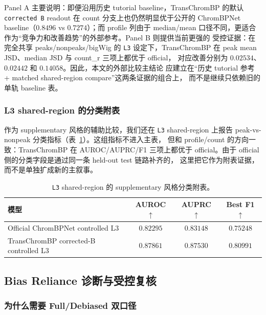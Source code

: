 \documentclass[11pt,a4paper]{ctexart}
\begin{document}
Panel A 主要说明：即便沿用历史 tutorial baseline，TransChromBP 的默认
\texttt{corrected B} readout 在 count 分支上也仍然明显优于公开的
ChromBPNet baseline（$0.8496$ vs $0.7274$）；而 profile 列由于 median/mean
口径不同，更适合作为“竞争力和改善趋势”的外部参考。Panel B 则提供当前更强的
受控证据：在完全共享 peaks/nonpeaks/bigWig 的 \texttt{L3} 设定下，TransChromBP
在 peak mean JSD、median JSD 与 count\_r 三项上都优于 official，
对应改善分别为 $0.02534$、$0.02442$ 和 $0.14058$。因此，本文的外部比较主结论
应建立在“历史 tutorial 参考 + matched shared-region compare”这两条证据的组合上，
而不是继续只依赖旧的单轨 baseline 表。

\subsubsection{L3 shared-region 的分类附表}

作为 supplementary 风格的辅助比较，我们还在 \texttt{L3} shared-region 上报告
peak-vs-nonpeak 分类指标（表~\ref{tab:l3-classification}）。这组指标不进入主表，
但和 profile/count 的方向一致：TransChromBP 在 AUROC/AUPRC/F1 三项上都优于
official。由于 official 侧的分类字段是通过同一条 held-out test 链路补齐的，
这里把它作为附表证据，而不是单独扩成新的主叙事。

\begin{table}[H]
\centering
\small
\caption{\texttt{L3} shared-region 的 supplementary 风格分类附表。}
\label{tab:l3-classification}
\begin{tabular}{lccc}
\toprule
模型 & AUROC $\uparrow$ & AUPRC $\uparrow$ & Best F1 $\uparrow$ \\
\midrule
Official ChromBPNet controlled L3 & $0.82295$ & $0.83148$ & $0.75248$ \\
TransChromBP corrected-B controlled L3 & $\mathbf{0.87861}$ & $\mathbf{0.87530}$ & $\mathbf{0.80991}$ \\
\bottomrule
\end{tabular}
\end{table}

\subsection{Bias Reliance 诊断与受控复核}
\label{sec:shortcut-analysis}

\subsubsection{为什么需要 Full/Debiased 双口径}
\end{document}
